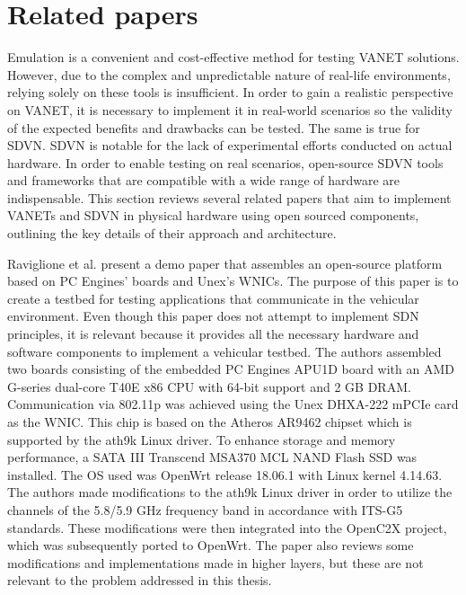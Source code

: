 \chapter{Related papers}
\label{cha:related_papers}

    Emulation is a convenient and cost-effective method for testing VANET solutions. However, due to the complex and unpredictable nature of real-life environments, relying solely on these tools is insufficient\cite{cardona_software-defined_2020}. In order to gain a realistic perspective on VANET, it is necessary to implement it in real-world scenarios so the validity of the expected benefits and drawbacks can be tested. The same is true for SDVN. 
    SDVN is notable for the lack of experimental efforts conducted on actual hardware. In order to enable testing on real scenarios, open-source SDVN tools and frameworks that are compatible with a wide range of hardware are indispensable\cite{cardona_software-defined_2020}. This section reviews several related papers that aim to implement VANETs and SDVN in physical hardware using open sourced components, outlining the key details of their approach and architecture. 
     
    Raviglione et al.\cite{raviglione_open_2019} present a demo paper that assembles an open-source platform based on PC Engines' boards and Unex's WNICs. The purpose of this paper is to create a testbed for testing applications that communicate in the vehicular environment. Even though this paper does not attempt to implement SDN principles, it is relevant because it provides all the necessary hardware and software components to implement a vehicular testbed.
    The authors assembled two boards consisting of the embedded PC Engines APU1D board with an AMD G-series dual-core T40E x86 CPU with 64-bit support and 2 GB DRAM. Communication via 802.11p was achieved using the Unex DHXA-222 mPCIe card as the WNIC. This chip is based on the Atheros AR9462 chipset which is supported by the ath9k Linux driver. To enhance storage and memory performance, a SATA III Transcend MSA370 MCL NAND Flash SSD was installed.
    The OS used was OpenWrt release 18.06.1 with Linux kernel 4.14.63. The authors made modifications to the ath9k Linux driver in order to utilize the channels of the 5.8/5.9 GHz frequency band in accordance with ITS-G5 standards. These modifications were then integrated into the OpenC2X project, which was subsequently ported to OpenWrt. The paper also reviews some modifications and implementations made in higher layers, but these are not relevant to the problem addressed in this thesis.
    
